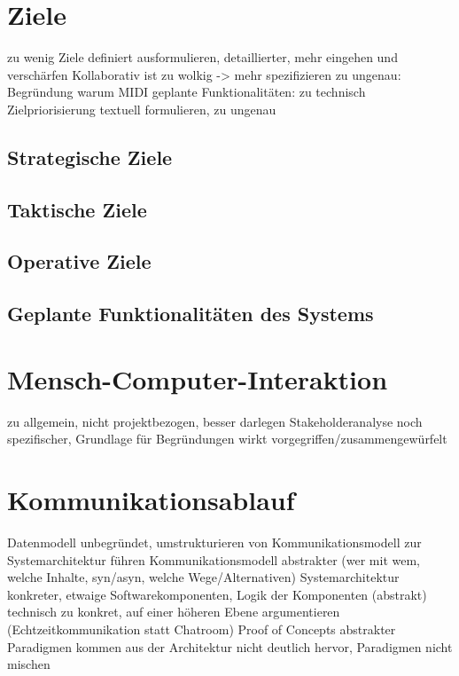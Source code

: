 \documentclass[a4paper, 12pt]{report}
\begin{document}

\chapter{Ziele}

zu wenig Ziele definiert
ausformulieren, detaillierter, mehr eingehen und verschärfen
Kollaborativ ist zu wolkig -> mehr spezifizieren
zu ungenau: Begründung warum MIDI
geplante Funktionalitäten: zu technisch
Zielpriorisierung textuell formulieren, zu ungenau

\section{Strategische Ziele}

\section{Taktische Ziele}

\section{Operative Ziele}

\section[Geplante Funktionalitäten]{Geplante Funktionalitäten des Systems}


\chapter{Mensch-Computer-Interaktion}

zu allgemein, nicht projektbezogen, besser darlegen
Stakeholderanalyse noch spezifischer, Grundlage für Begründungen
wirkt vorgegriffen/zusammengewürfelt


\chapter{Kommunikationsablauf}

Datenmodell unbegründet, umstrukturieren
von Kommunikationsmodell zur Systemarchitektur führen
Kommunikationsmodell abstrakter (wer mit wem, welche Inhalte, syn/asyn, welche Wege/Alternativen)
Systemarchitektur konkreter, etwaige Softwarekomponenten, Logik der Komponenten (abstrakt)
technisch zu konkret, auf einer höheren Ebene argumentieren (Echtzeitkommunikation statt Chatroom)
Proof of Concepts abstrakter
Paradigmen kommen aus der Architektur nicht deutlich hervor, Paradigmen nicht mischen
\end{document}
